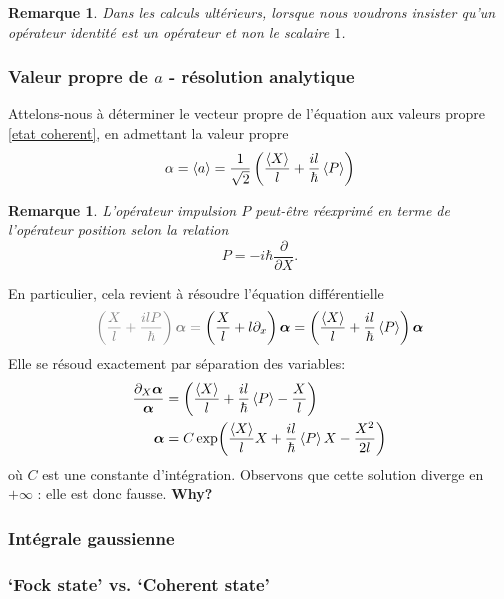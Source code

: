 \documentclass[11pt,oneside,a4paper]{article}
\newcommand{\h}{\ensuremath{\hbar}}
\newtheorem{remark}[theorem]{Remarque}
\begin{document}
\begin{remark}
  Dans les calculs ultérieurs, lorsque nous voudrons insister qu'un opérateur identité est un opérateur et non le scalaire $1$.
\end{remark}

\subsubsection{Valeur propre de $a$ - résolution analytique}

Attelons-nous à déterminer le vecteur propre de l'équation aux valeurs propre \eqref{etat coherent}, en admettant la valeur propre 
\begin{equation}
  \label{valeur propre}
  \alpha = \expval{a} = \frac{1}{\sqrt{2}}\left(\frac{\expval{X}}{l}+\frac{il}{\h}\expval{P}\right)
\end{equation}

\begin{remark}
  L'opérateur impulsion $P$ peut-être réexprimé en terme de l'opérateur position selon la relation 
  \begin{equation}
    P = -i\h\frac{\partial}{\partial X}.
  \end{equation}
\end{remark}
En particulier, cela revient à résoudre l'équation différentielle
\begin{equation}
  \color{gray}\left(\frac{X}{l}+\frac{ilP}{\hbar}\right)\bm{\alpha} = \color{black}\left(\frac{X}{l}+l\partial_x\right)\bm{\alpha} = \left(\frac{\expval{X}}{l}+\frac{il}{\h}\expval{P}\right)\bm{\alpha}
\end{equation}
Elle se résoud exactement par séparation des variables:
\begin{align}
  \frac{\partial_X \bm{\alpha}}{\bm{\alpha}} &= \left(\frac{\expval{X}}{l}+\frac{il}{\h}\expval{P}-\frac{X}{l}\right) \\
  \bm{\alpha} &= C\exp(\frac{\expval{X}}{l}X+\frac{il}{\h}\expval{P}X-\frac{X^2}{2l})
\end{align}
où $C$ est une constante d'intégration. Observons que cette solution diverge en $+\infty$ : \color{red} elle est donc fausse. \textbf{Why?} \color{black}

\subsubsection{Intégrale gaussienne}

\subsubsection{`Fock state' vs. `Coherent state'}
\end{document}
